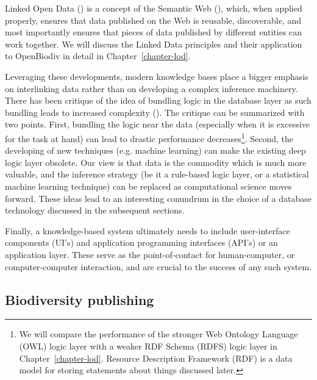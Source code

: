 Linked Open Data (\cite{heath_linked_2011}) is a concept of the Semantic Web (\cite{berners-lee_semantic_2001}), which, when applied properly, ensures that data published on the Web is reusable, discoverable, and most importantly ensures that pieces of data published by different entities can work together.  We will discuss the Linked Data principles and their application to OpenBiodiv in detail in Chapter~\ref{chapter-lod}.

Leveraging these developments, modern knowledge bases place a bigger emphasis on interlinking data rather than on developing a complex inference machinery. There has been critique of the idea of bundling logic in the database layer as such bundling leads to increased complexity (\cite{barrasa_rdf_2017}). The critique can be summarized with two points. First, bundling the logic near the data (especially when it is excessive for the task at hand) can lead to drastic performance decreases\footnote{ We will compare the performance of the stronger Web Ontology Language (OWL) logic layer with a weaker RDF Schema (RDFS) logic layer in Chapter~\ref{chapter-lod}. Resource Description Framework (RDF) is a data model for storing statements about things discussed later.}. Second, the developing of new techniques (e.g. machine learning) can make the existing deep logic layer obsolete. Our view is that data is the commodity which is much more valuable, and the inference strategy (be it a rule-based logic layer, or a statistical machine learning technique) can be replaced as computational science moves forward. These ideas lead to an interesting conundrum in the choice of a database technology discussed in the subsequent sections.

Finally, a knowledge-based system ultimately needs to include user-interface components (UI's) and application programming interfaces (API's) or an application layer. These serve as the point-of-contact for human-computer, or computer-computer interaction, and are crucial to the success of any such system.

\subsection*{Biodiversity publishing}

